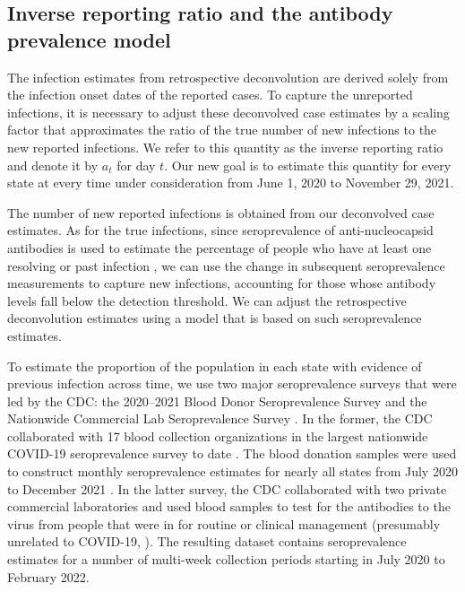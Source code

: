 \documentclass{article}
\begin{document}
\subsection{Inverse reporting ratio and the antibody prevalence model} 

The infection estimates from retrospective deconvolution are derived solely from
the infection onset dates of the reported cases. To capture the unreported
infections, it is necessary to adjust these deconvolved case estimates by a
scaling factor that approximates the ratio of the true number of new infections
to the new reported infections. We refer to this quantity as the inverse
reporting ratio and denote it by $a_t$ for day $t$. Our new goal is to estimate
this quantity for every state at every time under consideration from June 1,
2020 to November 29, 2021.

The number of new reported infections is obtained from our deconvolved case
estimates. As for the true infections, since seroprevalence of anti-nucleocapsid
antibodies is used to estimate the percentage of people who have at least one
resolving or past infection \citep{cdc2020data}, we can use the change in
subsequent seroprevalence measurements to capture new infections, accounting for
those whose antibody levels fall below the detection threshold. We can adjust
the retrospective deconvolution estimates using a model that is based on such
seroprevalence estimates.

To estimate the proportion of the population in each state with evidence of
previous infection across time, we use two major seroprevalence surveys that
were led by the CDC: the 2020--2021 Blood Donor Seroprevalence Survey and the
Nationwide Commercial Lab Seroprevalence Survey \citep{cdc2021blood,
cdc2021comm}. In the former, the CDC collaborated with 17 blood collection
organizations in the largest nationwide COVID-19 seroprevalence survey to date
\citep{cdc2021blood}. The blood donation samples were used to construct monthly
seroprevalence estimates for nearly all states from July 2020 to December 2021
\citep{jones2021estimated}. In the latter survey, the CDC collaborated with two
private commercial laboratories and used blood samples to test for the
antibodies to the virus from people that were in for routine or clinical
management (presumably unrelated to COVID-19, \citealp{bajema2021estimated}). The
resulting dataset contains seroprevalence estimates for a number of multi-week
collection periods starting in July 2020 to February 2022. 
\end{document}
